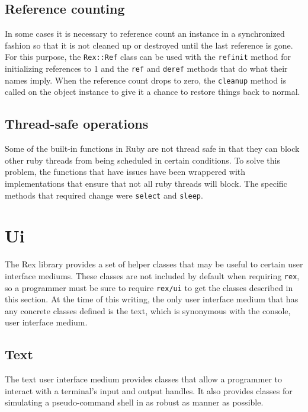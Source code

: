 \documentclass{report}
\begin{document}
        \subsection{Reference counting}

\par
In some cases it is necessary to reference count an instance in a
synchronized fashion so that it is not cleaned up or destroyed until
the last reference is gone.  For this purpose, the \texttt{Rex::Ref}
class can be used with the \texttt{refinit} method for initializing
references to 1 and the \texttt{ref} and \texttt{deref} methods that
do what their names imply.  When the reference count drops to zero,
the \texttt{cleanup} method is called on the object instance to give
it a chance to restore things back to normal.

        \subsection{Thread-safe operations}

\par
Some of the built-in functions in Ruby are not thread safe in that
they can block other ruby threads from being scheduled in certain
conditions.  To solve this problem, the functions that have issues
have been wrappered with implementations that ensure that not all
ruby threads will block.  The specific methods that required change
were \texttt{select} and \texttt{sleep}.

    \section{Ui}

\par
The Rex library provides a set of helper classes that may be useful
to certain user interface mediums.  These classes are not included
by default when requiring \texttt{rex}, so a programmer must be sure
to require \texttt{rex/ui} to get the classes described in this
section.  At the time of this writing, the only user interface
medium that has any concrete classes defined is the text, which is
synonymous with the console, user interface medium.

        \subsection{Text}

\par
The text user interface medium provides classes that allow a
programmer to interact with a terminal's input and output handles.
It also provides classes for simulating a pseudo-command shell in as
robust as manner as possible.
\end{document}
